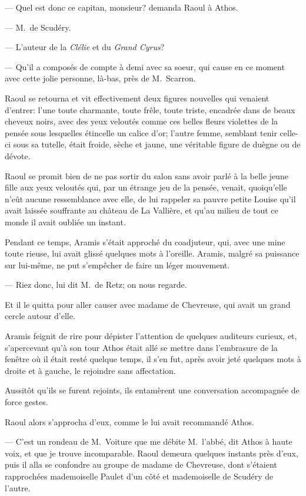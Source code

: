 — Quel est donc ce capitan, monsieur? demanda Raoul à Athos.

— M.~de Scudéry.

— L'auteur de la \textit{Clélie} et du \textit{Grand Cyrus}?

— Qu'il a composés de compte à demi avec sa soeur, qui cause en ce moment avec cette jolie personne, là-bas, près de M.~Scarron.

Raoul se retourna et vit effectivement deux figures nouvelles qui venaient d'entrer: l'une toute charmante, toute frêle, toute triste, encadrée dans de beaux cheveux noirs, avec des yeux veloutés comme ces belles fleurs violettes de la pensée sous lesquelles étincelle un calice d'or; l'autre femme, semblant tenir celle-ci sous sa tutelle, était froide, sèche et jaune, une véritable figure de duègne ou de dévote.

Raoul se promit bien de ne pas sortir du salon sans avoir parlé à la belle jeune fille aux yeux veloutés qui, par un étrange jeu de la pensée, venait, quoiqu'elle n'eût aucune ressemblance avec elle, de lui rappeler sa pauvre petite Louise qu'il avait laissée souffrante au château de La Vallière, et qu'au milieu de tout ce monde il avait oubliée un instant.

Pendant ce temps, Aramis s'était approché du coadjuteur, qui, avec une mine toute rieuse, lui avait glissé quelques mots à l'oreille. Aramis, malgré sa puissance sur lui-même, ne put s'empêcher de faire un léger mouvement.

— Riez donc, lui dit M.~de Retz; on nous regarde.

Et il le quitta pour aller causer avec madame de Chevreuse, qui avait un grand cercle autour d'elle.

Aramis feignit de rire pour dépister l'attention de quelques auditeurs curieux, et, s'apercevant qu'à son tour Athos était allé se mettre dans l'embrasure de la fenêtre où il était resté quelque temps, il s'en fut, après avoir jeté quelques mots à droite et à gauche, le rejoindre sans affectation.

Aussitôt qu'ils se furent rejoints, ils entamèrent une conversation accompagnée de force gestes.

Raoul alors s'approcha d'eux, comme le lui avait recommandé Athos.

— C'est un rondeau de M.~Voiture que me débite M.~l'abbé, dit Athos à haute voix, et que je trouve incomparable.
Raoul demeura quelques instants près d'eux, puis il alla se confondre au groupe de madame de Chevreuse, dont s'étaient rapprochées mademoiselle Paulet d'un côté et mademoiselle de Scudéry de l'autre.

